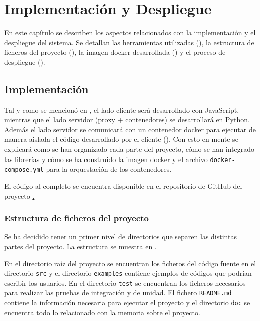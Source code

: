 \chapter{Implementación y Despliegue}\label{chap:implementacion_y_despliegue}
En este capítulo se describen los aspectos relacionados con la implementación y el despliegue del sistema. Se detallan las herramientas utilizadas (), la estructura de ficheros del proyecto (), la imagen docker desarrollada () y el proceso de despliegue ().

\section{Implementación} \label{sec:implementacion}
Tal y como se mencionó en , el lado cliente será desarrollado con JavaScript, mientras que el lado servidor (proxy + contenedores) se desarrollará en Python. Además el lado servidor se comunicará con un contenedor docker para ejecutar de manera aislada el código desarrollado por el cliente (). Con esto en mente se explicará como se han organizado cada parte del proyecto, cómo se han integrado las librerías y cómo se ha construido la imagen docker y el archivo \texttt{docker-compose.yml} para la orquestación de los contenedores.


El código al completo se encuentra disponible en el repositorio de GitHub del proyecto \href{https://github.com/Adri-Extremix/Trabajo-de-Fin-de-Grado}.

\subsection{Estructura de ficheros del proyecto}\label{subsec:estructura_ficheros_proyecto}

Se ha decidido tener un primer nivel de directorios que separen las distintas partes del proyecto. La estructura se muestra en .   
\begin{figure}[H]
    {
    \begin{tcolorbox}
    \end{tcolorbox}
    }
\end{figure}
En el directorio raíz del proyecto se encuentran los ficheros del código fuente en el directorio \texttt{src} y el directorio \texttt{examples} contiene ejemplos de códigos que podrían escribir los usuarios. En el directorio \texttt{test} se encuentran los ficheros necesarios para realizar las pruebas de integración y de unidad. El fichero \texttt{README.md} contiene la información necesaria para ejecutar el proyecto y el directorio \texttt{doc} se encuentra todo lo relacionado con la memoria sobre el proyecto.

